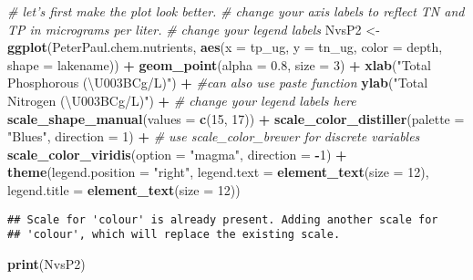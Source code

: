\documentclass[]{article}
\newenvironment{Shaded}{\begin{snugshade}}{\end{snugshade}}
\newcommand{\KeywordTok}[1]{\textcolor[rgb]{0.13,0.29,0.53}{\textbf{#1}}}
\newcommand{\DataTypeTok}[1]{\textcolor[rgb]{0.13,0.29,0.53}{#1}}
\newcommand{\DecValTok}[1]{\textcolor[rgb]{0.00,0.00,0.81}{#1}}
\newcommand{\FloatTok}[1]{\textcolor[rgb]{0.00,0.00,0.81}{#1}}
\newcommand{\StringTok}[1]{\textcolor[rgb]{0.31,0.60,0.02}{#1}}
\newcommand{\CommentTok}[1]{\textcolor[rgb]{0.56,0.35,0.01}{\textit{#1}}}
\newcommand{\OperatorTok}[1]{\textcolor[rgb]{0.81,0.36,0.00}{\textbf{#1}}}
\newcommand{\NormalTok}[1]{#1}
\begin{document}
\begin{Shaded}
\begin{Highlighting}[]
\CommentTok{# let's first make the plot look better.}
\CommentTok{# change your axis labels to reflect TN and TP in micrograms per liter.}
\CommentTok{# change your legend labels}
\NormalTok{NvsP2 <-}
\StringTok{  }\KeywordTok{ggplot}\NormalTok{(PeterPaul.chem.nutrients, }\KeywordTok{aes}\NormalTok{(}\DataTypeTok{x =}\NormalTok{ tp_ug, }\DataTypeTok{y =}\NormalTok{ tn_ug, }\DataTypeTok{color =}\NormalTok{ depth, }\DataTypeTok{shape =}\NormalTok{ lakename)) }\OperatorTok{+}
\StringTok{  }\KeywordTok{geom_point}\NormalTok{(}\DataTypeTok{alpha =} \FloatTok{0.8}\NormalTok{, }\DataTypeTok{size =} \DecValTok{3}\NormalTok{) }\OperatorTok{+}
\StringTok{  }\KeywordTok{xlab}\NormalTok{(}\StringTok{"Total Phosphorous (\textbackslash{}U003BCg/L)"}\NormalTok{) }\OperatorTok{+}\StringTok{ }\CommentTok{#can also use paste function}
\StringTok{  }\KeywordTok{ylab}\NormalTok{(}\StringTok{"Total Nitrogen (\textbackslash{}U003BCg/L)"}\NormalTok{) }\OperatorTok{+}
\StringTok{  }\CommentTok{# change your legend labels here}
\StringTok{  }\KeywordTok{scale_shape_manual}\NormalTok{(}\DataTypeTok{values =} \KeywordTok{c}\NormalTok{(}\DecValTok{15}\NormalTok{, }\DecValTok{17}\NormalTok{)) }\OperatorTok{+}
\StringTok{  }\KeywordTok{scale_color_distiller}\NormalTok{(}\DataTypeTok{palette =} \StringTok{"Blues"}\NormalTok{, }\DataTypeTok{direction =} \DecValTok{1}\NormalTok{) }\OperatorTok{+}\StringTok{ }\CommentTok{# use scale_color_brewer for discrete variables}
\StringTok{  }\KeywordTok{scale_color_viridis}\NormalTok{(}\DataTypeTok{option =} \StringTok{"magma"}\NormalTok{, }\DataTypeTok{direction =} \OperatorTok{-}\DecValTok{1}\NormalTok{) }\OperatorTok{+}
\StringTok{  }\KeywordTok{theme}\NormalTok{(}\DataTypeTok{legend.position =} \StringTok{"right"}\NormalTok{, }
        \DataTypeTok{legend.text =} \KeywordTok{element_text}\NormalTok{(}\DataTypeTok{size =} \DecValTok{12}\NormalTok{), }\DataTypeTok{legend.title =} \KeywordTok{element_text}\NormalTok{(}\DataTypeTok{size =} \DecValTok{12}\NormalTok{))}
\end{Highlighting}
\end{Shaded}

\begin{verbatim}
## Scale for 'colour' is already present. Adding another scale for
## 'colour', which will replace the existing scale.
\end{verbatim}

\begin{Shaded}
\begin{Highlighting}[]
\KeywordTok{print}\NormalTok{(NvsP2)}
\end{Highlighting}
\end{Shaded}
\end{document}
